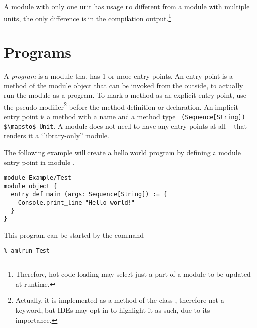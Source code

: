 A module with only one unit has usage no different from a module with multiple units, the only difference is in the compilation output.\footnote{Therefore, hot code loading may select just a part of a module to be updated at runtime.}





\section{Programs}
\label{sec:programs}

A {\em program} is a module that has 1 or more entry points. An entry point is a method of the module object that can be invoked from the outside, to actually run the module as a program. To mark a method as an explicit entry point, use the  pseudo-modifier\footnote{Actually, it is implemented as a method of the class , therefore not a keyword, but IDEs may opt-in to highlight it as such, due to its importance.} before the method definition or declaration. An implicit entry point is a method with a name  and a method type ~\lstinline!(Sequence[String]) $\mapsto$ Unit!. A module does not need to have any entry points at all -- that renders it a ``library-only'' module. 

\example The following example will create a hello world program by defining a module entry point in module . 

\grammar\begin{lstlisting}[morekeywords={entry}]
module Example/Test
module object {
  entry def main (args: Sequence[String]) := {
    Console.print_line "Hello world!"
  }
}
\end{lstlisting}

This program can be started by the command
\begin{lstlisting}
% amlrun Test
\end{lstlisting}








